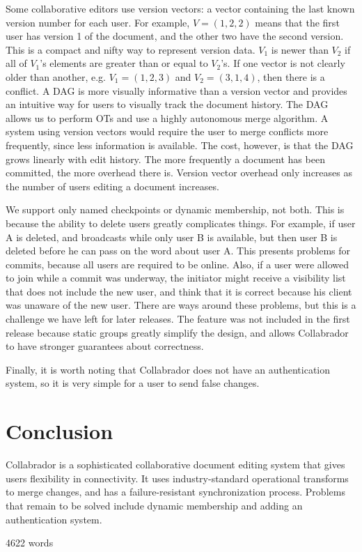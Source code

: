\documentclass[11pt,titlepage]{article}
\begin{document}
Some collaborative editors use version vectors: a vector containing
the last known version number for each user. For example, \(V = (1, 2,
2)\) means that the first user has version 1 of the document, and the
other two have the second version.  This is a compact and nifty way to
represent version data. \(V_1\) is newer than \(V_2\) if all of
\(V_1\)'s elements are greater than or equal to \(V_2\)'s. If one
vector is not clearly older than another, e.g. \(V_1 = (1,2,3)\) and
\(V_2 = (3,1,4)\), then there is a conflict. A DAG is more visually
informative than a version vector and provides an intuitive way for
users to visually track the document history. The DAG allows us to
perform OTs and use a highly autonomous merge algorithm.  A system
using version vectors would require the user to merge conflicts more
frequently, since less information is available. The cost, however, is
that the DAG grows linearly with edit history. The more frequently a
document has been committed, the more overhead there is. Version
vector overhead only increases as the number of users editing a
document increases.

We support only named checkpoints or dynamic membership, not
both. This is because the ability to delete users greatly complicates
things. For example, if user A is deleted, and broadcasts while only
user B is available, but then user B is deleted before he can pass on
the word about user A. This presents problems for commits, because all
users are required to be online.  Also, if a user were allowed to join
while a commit was underway, the initiator might receive a visibility
list that does not include the new user, and think that it is correct
because his client was unaware of the new user.  There are ways around
these problems, but this is a challenge we have left for later
releases. The feature was not included in the first release because
static groups greatly simplify the design, and allows Collabrador to 
have stronger guarantees about correctness.

Finally, it is worth noting that Collabrador does not have an
authentication system, so it is very simple for a user to send false
changes.

\section{Conclusion}

Collabrador is a sophisticated collaborative document editing system
that gives users flexibility in connectivity. It uses
industry-standard operational transforms to merge changes, and has a
failure-resistant synchronization process.  Problems that remain to be
solved include dynamic membership and adding an authentication system.

 

4622 words
\end{document}
